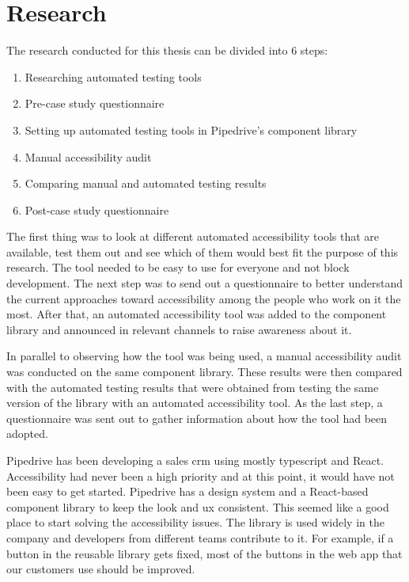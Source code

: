 \documentclass{master_thesis}
\begin{document}
\section{Research} \label{chap:research}

The research conducted for this thesis can be divided into 6 steps:

\begin{enumerate}
	\item Researching automated testing tools
	\item Pre-case study questionnaire
	\item Setting up automated testing tools in Pipedrive's component library
	\item Manual accessibility audit
	\item Comparing manual and automated testing results
	\item Post-case study questionnaire
\end{enumerate}

The first thing was to look at different automated accessibility tools that are available, test them out and see which of them would best fit the purpose of this research. The tool needed to be easy to use for everyone and not block development. The next step was to send out a questionnaire to better understand the current approaches toward accessibility among the people who work on it the most. After that, an automated accessibility tool was added to the component library and announced in relevant channels to raise awareness about it.

In parallel to observing how the tool was being used, a manual accessibility audit was conducted on the same component library. These results were then compared with the automated testing results that were obtained from testing the same version of the library with an automated accessibility tool. As the last step, a questionnaire was sent out to gather information about how the tool had been adopted.

Pipedrive has been developing a sales \ac{crm} using mostly typescript and React. Accessibility had never been a high priority and at this point, it would have not been easy to get started. Pipedrive has a design system and a React-based component library to keep the look and \ac{ux} consistent. This seemed like a good place to start solving the accessibility issues. The library is used widely in the company and developers from different teams contribute to it. For example, if a button in the reusable library gets fixed, most of the buttons in the web app that our customers use should be improved.
\end{document}
